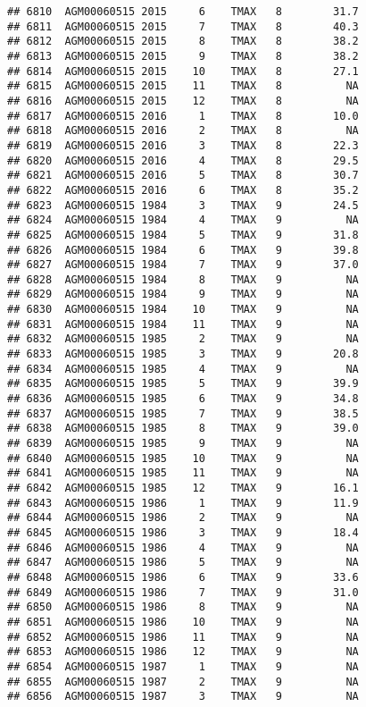 \documentclass{article}\usepackage[]{graphicx}\usepackage[]{color}
\makeatletter
\newenvironment{kframe}{%
 \def\at@end@of@kframe{}%
 \ifinner\ifhmode%
  \def\at@end@of@kframe{\end{minipage}}%
  \begin{minipage}{\columnwidth}%
 \fi\fi%
 \def\FrameCommand##1{\hskip\@totalleftmargin \hskip-\fboxsep
 \colorbox{shadecolor}{##1}\hskip-\fboxsep
     \hskip-\linewidth \hskip-\@totalleftmargin \hskip\columnwidth}%
 \MakeFramed {\advance\hsize-\width
   \@totalleftmargin\z@ \linewidth\hsize
   \@setminipage}}%
 {\par\unskip\endMakeFramed%
 \at@end@of@kframe}
\newenvironment{knitrout}{}{} %
\makeatother
\begin{document}
\begin{knitrout}
\begin{kframe}
\begin{verbatim}
## 6810  AGM00060515 2015     6    TMAX   8        31.7
## 6811  AGM00060515 2015     7    TMAX   8        40.3
## 6812  AGM00060515 2015     8    TMAX   8        38.2
## 6813  AGM00060515 2015     9    TMAX   8        38.2
## 6814  AGM00060515 2015    10    TMAX   8        27.1
## 6815  AGM00060515 2015    11    TMAX   8          NA
## 6816  AGM00060515 2015    12    TMAX   8          NA
## 6817  AGM00060515 2016     1    TMAX   8        10.0
## 6818  AGM00060515 2016     2    TMAX   8          NA
## 6819  AGM00060515 2016     3    TMAX   8        22.3
## 6820  AGM00060515 2016     4    TMAX   8        29.5
## 6821  AGM00060515 2016     5    TMAX   8        30.7
## 6822  AGM00060515 2016     6    TMAX   8        35.2
## 6823  AGM00060515 1984     3    TMAX   9        24.5
## 6824  AGM00060515 1984     4    TMAX   9          NA
## 6825  AGM00060515 1984     5    TMAX   9        31.8
## 6826  AGM00060515 1984     6    TMAX   9        39.8
## 6827  AGM00060515 1984     7    TMAX   9        37.0
## 6828  AGM00060515 1984     8    TMAX   9          NA
## 6829  AGM00060515 1984     9    TMAX   9          NA
## 6830  AGM00060515 1984    10    TMAX   9          NA
## 6831  AGM00060515 1984    11    TMAX   9          NA
## 6832  AGM00060515 1985     2    TMAX   9          NA
## 6833  AGM00060515 1985     3    TMAX   9        20.8
## 6834  AGM00060515 1985     4    TMAX   9          NA
## 6835  AGM00060515 1985     5    TMAX   9        39.9
## 6836  AGM00060515 1985     6    TMAX   9        34.8
## 6837  AGM00060515 1985     7    TMAX   9        38.5
## 6838  AGM00060515 1985     8    TMAX   9        39.0
## 6839  AGM00060515 1985     9    TMAX   9          NA
## 6840  AGM00060515 1985    10    TMAX   9          NA
## 6841  AGM00060515 1985    11    TMAX   9          NA
## 6842  AGM00060515 1985    12    TMAX   9        16.1
## 6843  AGM00060515 1986     1    TMAX   9        11.9
## 6844  AGM00060515 1986     2    TMAX   9          NA
## 6845  AGM00060515 1986     3    TMAX   9        18.4
## 6846  AGM00060515 1986     4    TMAX   9          NA
## 6847  AGM00060515 1986     5    TMAX   9          NA
## 6848  AGM00060515 1986     6    TMAX   9        33.6
## 6849  AGM00060515 1986     7    TMAX   9        31.0
## 6850  AGM00060515 1986     8    TMAX   9          NA
## 6851  AGM00060515 1986    10    TMAX   9          NA
## 6852  AGM00060515 1986    11    TMAX   9          NA
## 6853  AGM00060515 1986    12    TMAX   9          NA
## 6854  AGM00060515 1987     1    TMAX   9          NA
## 6855  AGM00060515 1987     2    TMAX   9          NA
## 6856  AGM00060515 1987     3    TMAX   9          NA

\end{verbatim}
\end{kframe}
\end{knitrout}
\end{document}
